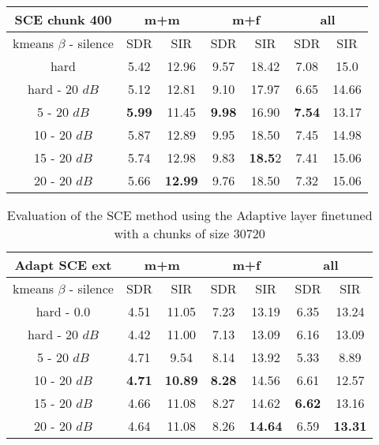 \documentclass[master,final,11pt]{iscs-thesis}
\begin{document}
\begin{table}[h]
\centering
\begin{tabular}{c|c|c|c|c|c|c}
SCE chunk 400 & \multicolumn{2}{c|}{m+m} & \multicolumn{2}{c|}{m+f} & \multicolumn{2}{c}{all} \\ 
\hline 
kmeans $\beta$ - silence & SDR & SIR & SDR & SIR & SDR & SIR \\ 
\hline
hard  & 5.42 & 12.96 & 9.57 & 18.42 & 7.08 & 15.0 \\ 
\hline
hard - 20 $dB$  & 5.12 & 12.81 & 9.10 & 17.97 & 6.65 & 14.66 \\
\hline
5 - 20 $dB$  & \cellcolor{green}\textbf{5.99} & \cellcolor{green}11.45 & \cellcolor{green}\textbf{9.98} & \cellcolor{green}16.90 & \cellcolor{green}\textbf{7.54} & \cellcolor{green}13.17 \\ 
\hline
10 - 20 $dB$  & 5.87 & 12.89 & 9.95 & 18.50 & 7.45 & 14.98 \\ 
\hline
15 - 20 $dB$ & 5.74 & 12.98 & 9.83 & \textbf{18.5}2 & 7.41 & 15.06 \\ 
\hline
20 - 20 $dB$ & 5.66 & \textbf{12.99} & 9.76 & 18.50 & 7.32 & 15.06 \\ 
\end{tabular}
\captionsetup{justification=centering}
\caption{}
\label{table:SCE400}
\end{table}

\begin{table}[h]
\centering
\begin{tabular}{c|c|c|c|c|c|c}
Adapt SCE ext & \multicolumn{2}{c|}{m+m} & \multicolumn{2}{c|}{m+f} & \multicolumn{2}{c}{all} \\ 
\hline 
kmeans $\beta$ - silence & SDR & SIR & SDR & SIR & SDR & SIR \\ 
\hline
hard - 0.0  & 4.51 & 11.05 & 7.23 & 13.19 & 6.35 & 13.24 \\ 
\hline
hard - 20 $dB$  & 4.42 & 11.00 & 7.13 & 13.09 & 6.16 & 13.09 \\
\hline
5 - 20 $dB$  & 4.71 & 9.54 & 8.14 & 13.92 & 5.33 & 8.89 \\ 
\hline
10 - 20 $dB$  & \cellcolor{green}\textbf{4.71} & \cellcolor{green}\textbf{10.89} & \cellcolor{green}\textbf{8.28} & \cellcolor{green}14.56 & 6.61 & 12.57 \\ 
\hline
15 - 20 $dB$ & 4.66 & 11.08 & 8.27 & 14.62 & \cellcolor{green}\textbf{6.62} & \cellcolor{green}13.16 \\ 
\hline
20 - 20 $dB$ & 4.64 & 11.08 & 8.26 & \textbf{14.64} & 6.59 & \textbf{13.31} \\ 
\end{tabular}
\caption{Evaluation of the SCE method using the Adaptive layer finetuned with a chunks of size 30720}
\label{table:AdaptSCEext}
\end{table}
\end{document}
